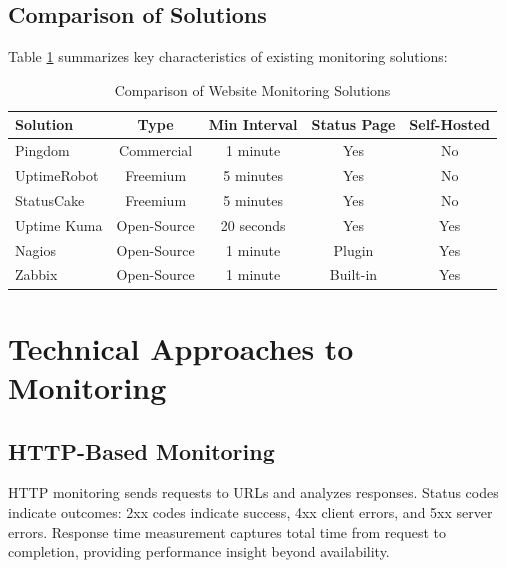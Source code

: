 \subsection{Comparison of Solutions}

Table \ref{tab:monitoring-comparison} summarizes key characteristics of existing monitoring solutions:

\begin{table}[htbp]
    \centering
    \caption{Comparison of Website Monitoring Solutions}
    \label{tab:monitoring-comparison}
    \begin{tabular}{lcccc}
        \toprule
        \textbf{Solution} & \textbf{Type} & \textbf{Min Interval} & \textbf{Status Page} & \textbf{Self-Hosted} \\
        \midrule
        Pingdom           & Commercial    & 1 minute              & Yes                  & No                   \\
        UptimeRobot       & Freemium      & 5 minutes             & Yes                  & No                   \\
        StatusCake        & Freemium      & 5 minutes             & Yes                  & No                   \\
        Uptime Kuma       & Open-Source   & 20 seconds            & Yes                  & Yes                  \\
        Nagios            & Open-Source   & 1 minute              & Plugin               & Yes                  \\
        Zabbix            & Open-Source   & 1 minute              & Built-in             & Yes                  \\
        \bottomrule
    \end{tabular}
\end{table}

\section{Technical Approaches to Monitoring}

\subsection{HTTP-Based Monitoring}

HTTP monitoring sends requests to URLs and analyzes responses. Status codes indicate outcomes: 2xx codes indicate success, 4xx client errors, and 5xx server errors. Response time measurement captures total time from request to completion, providing performance insight beyond availability.

